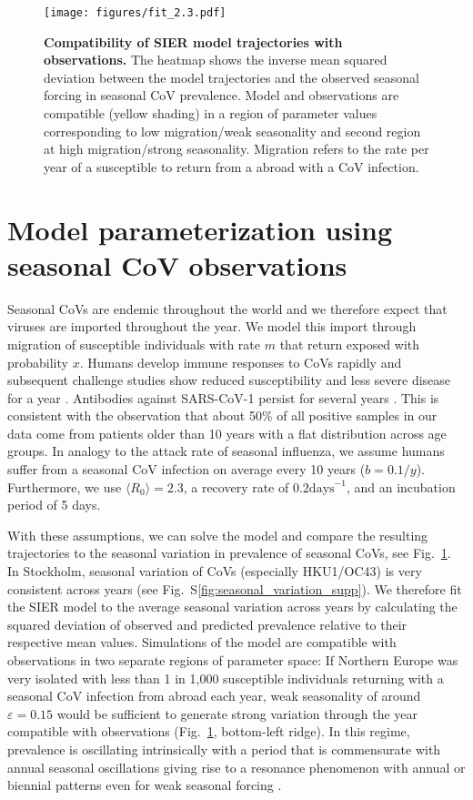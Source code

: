 \documentclass[rmp, reprint, superscriptaddress, floatfix,amsmath]{revtex4-1}
\newcommand{\forcing}{\varepsilon}
\begin{document}
\begin{figure}
    \centering
    \texttt{[image: figures/fit\_2.3.pdf]}
    \caption{{\bf Compatibility of SIER model trajectories with observations.} The heatmap shows the inverse mean squared deviation between the model trajectories and the observed seasonal forcing in seasonal CoV prevalence. Model and observations are compatible (yellow shading) in a region of parameter values corresponding to low migration/weak seasonality and second region at high migration/strong seasonality. Migration refers to the rate per year of a susceptible to return from a abroad with a CoV infection.}
    \label{fig:parameter_seasonal}
\end{figure}

\section{Model parameterization using seasonal CoV observations}
Seasonal CoVs are endemic throughout the world and we therefore expect that viruses are imported throughout the year. 
We model this import through migration of susceptible individuals with rate $m$ that return exposed with probability $x$. 
Humans develop immune responses to CoVs rapidly and subsequent challenge studies show reduced susceptibility and less severe disease for a year \citep{callow_time_1990}.
Antibodies against SARS-CoV-1 persist for several years \citep{guo_long-term_2020}. 
This is consistent with the observation that about 50\% of all positive samples in our data come from patients older than 10 years with a flat distribution across age groups.
In analogy to the attack rate of seasonal influenza, we assume humans suffer from a seasonal CoV infection on average every 10 years ($b=0.1/y$).
Furthermore, we use $\langle R_0\rangle=2.3$, a recovery rate of $0.2 \mathrm{days}^{-1}$, and an incubation period of 5 days.

With these assumptions, we can solve the model and compare the resulting trajectories to the seasonal variation in prevalence of seasonal CoVs, see Fig.~\ref{fig:parameter_seasonal}.
In Stockholm, seasonal variation of CoVs (especially HKU1/OC43) is very consistent across years (see Fig.~S\ref{fig:seasonal_variation_supp}). 
We therefore fit the SIER model to the average seasonal variation across years by calculating the squared deviation of observed and predicted prevalence relative to their respective mean values. 
Simulations of the model are compatible with observations in two separate regions of parameter space: If Northern Europe was very isolated with less than 1 in 1,000 susceptible individuals returning with a seasonal CoV infection from abroad each year, weak seasonality of around $\forcing=0.15$ would be sufficient to generate strong variation through the year compatible with observations (Fig.~\ref{fig:parameter_seasonal}, bottom-left ridge).
In this regime, prevalence is oscillating intrinsically with a period that is commensurate with annual seasonal oscillations giving rise to a resonance phenomenon with annual or biennial patterns even for weak seasonal forcing \citep{dushoff_dynamical_2004,chen_regular_2017}.
\end{document}
